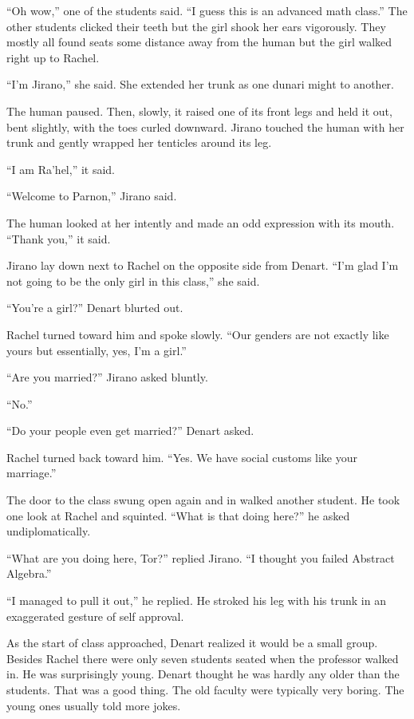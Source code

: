 ``Oh wow,'' one of the students said. ``I guess this is an advanced math class.'' The other
students clicked their teeth but the girl shook her ears vigorously. They mostly all found seats
some distance away from the human but the girl walked right up to Rachel.

``I'm Jirano,'' she said. She extended her trunk as one dunari might to another.

The human paused. Then, slowly, it raised one of its front legs and held it out, bent slightly,
with the toes curled downward. Jirano touched the human with her trunk and gently wrapped her
tenticles around its leg.

``I am Ra'hel,'' it said.

``Welcome to Parnon,'' Jirano said.

The human looked at her intently and made an odd expression with its mouth. ``Thank you,'' it
said.

Jirano lay down next to Rachel on the opposite side from Denart. ``I'm glad I'm not going to be
the only girl in this class,'' she said.

``You're a girl?'' Denart blurted out.

Rachel turned toward him and spoke slowly. ``Our genders are not exactly like yours but
essentially, yes, I'm a girl.''

``Are you married?'' Jirano asked bluntly.

``No.''

``Do your people even get married?'' Denart asked.

Rachel turned back toward him. ``Yes. We have social customs like your marriage.''

The door to the class swung open again and in walked another student. He took one look at Rachel
and squinted. ``What is that doing here?'' he asked undiplomatically.

``What are you doing here, Tor?'' replied Jirano. ``I thought you failed Abstract Algebra.''

``I managed to pull it out,'' he replied. He stroked his leg with his trunk in an exaggerated
gesture of self approval.

As the start of class approached, Denart realized it would be a small group. Besides Rachel
there were only seven students seated when the professor walked in. He was surprisingly young.
Denart thought he was hardly any older than the students. That was a good thing. The old faculty
were typically very boring. The young ones usually told more jokes.


